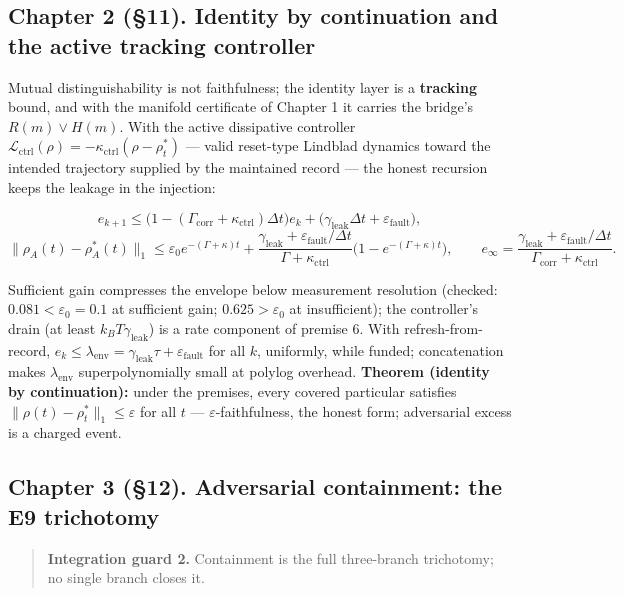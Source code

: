 \documentclass[
]{article}
\begin{document}
\subsection{Chapter 2 (§11). Identity by continuation and the active
tracking
controller}\label{chapter-2-11.-identity-by-continuation-and-the-active-tracking-controller}

Mutual distinguishability is not faithfulness; the identity layer is a
\textbf{tracking} bound, and with the manifold certificate of Chapter 1
it carries the bridge's \(R(m)\lor H(m)\). With the active dissipative
controller
\(\mathcal L_{\mathrm{ctrl}}(\rho)=-\kappa_{\mathrm{ctrl}}(\rho-\rho^*_t)\)
--- valid reset-type Lindblad dynamics toward the intended trajectory
supplied by the maintained record --- the honest recursion keeps the
leakage in the injection:

\[
e_{k+1}\le\bigl(1-(\Gamma_{\mathrm{corr}}+\kappa_{\mathrm{ctrl}})\Delta t\bigr)e_k+\bigl(\gamma_{\mathrm{leak}}\Delta t+\varepsilon_{\mathrm{fault}}\bigr),
\] \[
\lVert\rho_A(t)-\rho_A^*(t)\rVert_1\le\varepsilon_0e^{-(\Gamma+\kappa)t}+\frac{\gamma_{\mathrm{leak}}+\varepsilon_{\mathrm{fault}}/\Delta t}{\Gamma+\kappa_{\mathrm{ctrl}}}\bigl(1-e^{-(\Gamma+\kappa)t}\bigr),
\qquad
e_\infty=\frac{\gamma_{\mathrm{leak}}+\varepsilon_{\mathrm{fault}}/\Delta t}{\Gamma_{\mathrm{corr}}+\kappa_{\mathrm{ctrl}}}.
\]

Sufficient gain compresses the envelope below measurement resolution
(checked: \(0.081<\varepsilon_0=0.1\) at sufficient gain;
\(0.625>\varepsilon_0\) at insufficient); the controller's drain (at
least \(k_BT\gamma_{\mathrm{leak}}\)) is a rate component of premise 6.
With refresh-from-record,
\(e_k\le\lambda_{\mathrm{env}}=\gamma_{\mathrm{leak}}\tau+\varepsilon_{\mathrm{fault}}\)
for all \(k\), uniformly, while funded; concatenation makes
\(\lambda_{\mathrm{env}}\) superpolynomially small at polylog overhead.
\textbf{Theorem (identity by continuation):} under the premises, every
covered particular satisfies
\(\lVert\rho(t)-\rho^*_t\rVert_1\le\varepsilon\) for all \(t\) ---
\(\varepsilon\)-faithfulness, the honest form; adversarial excess is a
charged event.

\subsection{Chapter 3 (§12). Adversarial containment: the E9
trichotomy}\label{chapter-3-12.-adversarial-containment-the-e9-trichotomy}

\begin{quote}
\textbf{Integration guard 2.} Containment is the full three-branch
trichotomy; no single branch closes it.
\end{quote}
\end{document}
